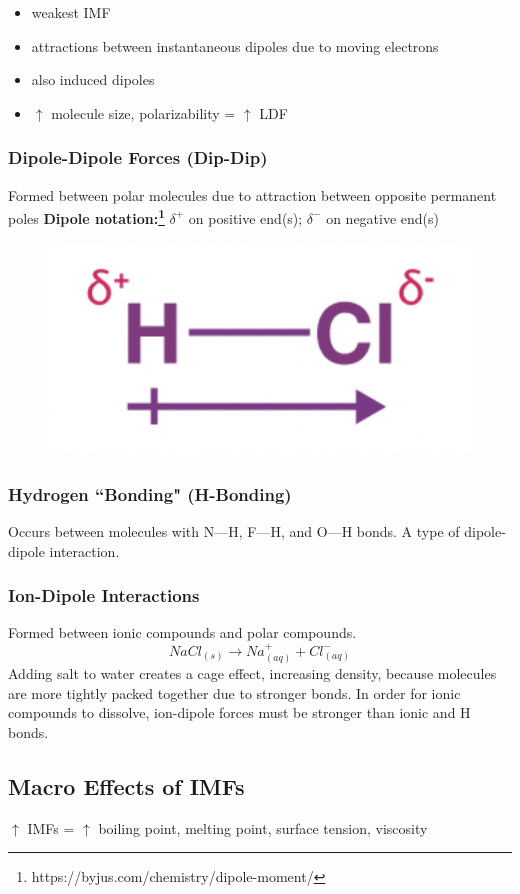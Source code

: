 \documentclass[a4paper, 12pt]{article}
\begin{document}
\begin{itemize}[leftmargin=*, nosep]
    \item weakest IMF
    \item attractions between instantaneous dipoles due to moving electrons
    \item also induced dipoles
    \item $\uparrow$ molecule size, polarizability = $\uparrow$ LDF
\end{itemize}

\subsubsection{Dipole-Dipole Forces (Dip-Dip)}
Formed between polar molecules due to attraction between opposite permanent poles
\textbf{Dipole notation:\footnote{https://byjus.com/chemistry/dipole-moment/}} $\delta^+$ on positive end(s); $\delta^-$ on negative end(s)

\begin{figure}[H]
    \centering
    \includegraphics[width=0.3\linewidth]{polarmol.png}
    \label{fig:ummmmmm}
\end{figure}

\subsubsection{Hydrogen ``Bonding" (H-Bonding)}
Occurs between molecules with N---H, F---H, and O---H bonds. A type of dipole-dipole interaction.

\subsubsection{Ion-Dipole Interactions}
Formed between ionic compounds and polar compounds.
$$NaCl_{(s)} \longrightarrow Na^+_{(aq)} + Cl^-_{(aq)}$$
Adding salt to water creates a cage effect, increasing density, because molecules are more tightly packed together due to stronger bonds. In order for ionic compounds to dissolve, ion-dipole forces must be stronger than ionic and H bonds.

\subsection{Macro Effects of IMFs}
$\uparrow$ IMFs = $\uparrow$ boiling point, melting point, surface tension, viscosity
\end{document}

